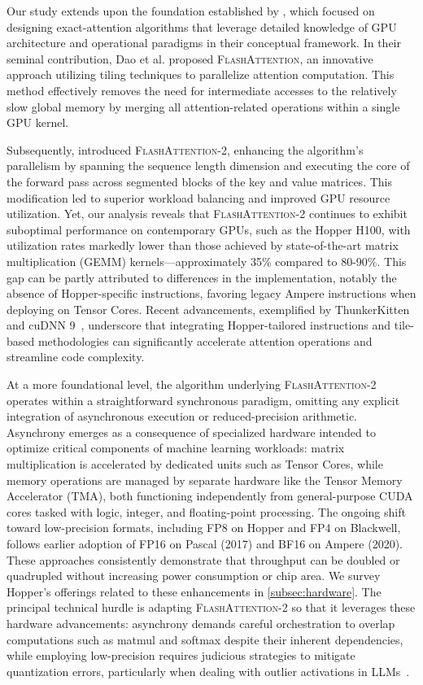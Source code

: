Our study extends upon the foundation established by \citet{dao2022flashattention}, which focused on designing exact-attention algorithms that leverage detailed knowledge of GPU architecture and operational paradigms in their conceptual framework. In their seminal contribution, Dao et al. proposed \textsc{FlashAttention}, an innovative approach utilizing tiling techniques to parallelize attention computation. This method effectively removes the need for intermediate accesses to the relatively slow global memory by merging all attention-related operations within a single GPU kernel.

Subsequently, \citet{dao2023flashattention2} introduced \textsc{FlashAttention-2}, enhancing the algorithm’s parallelism by spanning the sequence length dimension and executing the core of the forward pass across segmented blocks of the key and value matrices. This modification led to superior workload balancing and improved GPU resource utilization. Yet, our analysis reveals that \textsc{FlashAttention-2} continues to exhibit suboptimal performance on contemporary GPUs, such as the Hopper H100, with utilization rates markedly lower than those achieved by state-of-the-art matrix multiplication (GEMM) kernels—approximately 35\% compared to 80-90\%. This gap can be partly attributed to differences in the implementation, notably the absence of Hopper-specific instructions, favoring legacy Ampere instructions when deploying on Tensor Cores. Recent advancements, exemplified by ThunkerKitten~\citep{spector2024thunder} and cuDNN 9~\citep{cudnn9}, underscore that integrating Hopper-tailored instructions and tile-based methodologies can significantly accelerate attention operations and streamline code complexity.

At a more foundational level, the algorithm underlying \textsc{FlashAttention-2} operates within a straightforward synchronous paradigm, omitting any explicit integration of asynchronous execution or reduced-precision arithmetic. Asynchrony emerges as a consequence of specialized hardware intended to optimize critical components of machine learning workloads: matrix multiplication is accelerated by dedicated units such as Tensor Cores, while memory operations are managed by separate hardware like the Tensor Memory Accelerator (TMA), both functioning independently from general-purpose CUDA cores tasked with logic, integer, and floating-point processing. The ongoing shift toward low-precision formats, including FP8 on Hopper and FP4 on Blackwell, follows earlier adoption of FP16 on Pascal (2017) and BF16 on Ampere (2020). These approaches consistently demonstrate that throughput can be doubled or quadrupled without increasing power consumption or chip area. We survey Hopper's offerings related to these enhancements in \cref{subsec:hardware}. The principal technical hurdle is adapting \textsc{FlashAttention-2} so that it leverages these hardware advancements: asynchrony demands careful orchestration to overlap computations such as matmul and softmax despite their inherent dependencies, while employing low-precision requires judicious strategies to mitigate quantization errors, particularly when dealing with outlier activations in LLMs~\citep{dettmers2208llm, sun2024massive}.

